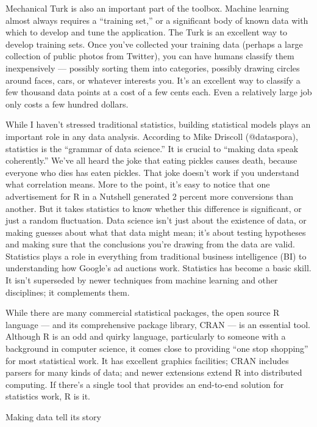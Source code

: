 Mechanical Turk is also an important part of the toolbox. Machine learning almost always requires a “training set,” or a significant body of known data with which to develop and tune the application. The Turk is an excellent way to develop training sets. Once you’ve collected your training data (perhaps a large collection of public photos from Twitter), you can have humans classify them inexpensively — possibly sorting them into categories, possibly drawing circles around faces, cars, or whatever interests you. It’s an excellent way to classify a few thousand data points at a cost of a few cents each. Even a relatively large job only costs a few hundred dollars.

While I haven’t stressed traditional statistics, building statistical models plays an important role in any data analysis. According to Mike Driscoll (@dataspora), statistics is the “grammar of data science.” It is crucial to “making data speak coherently.” We’ve all heard the joke that eating pickles causes death, because everyone who dies has eaten pickles. That joke doesn’t work if you understand what correlation means. More to the point, it’s easy to notice that one advertisement for R in a Nutshell generated 2 percent more conversions than another. But it takes statistics to know whether this difference is significant, or just a random fluctuation. Data science isn’t just about the existence of data, or making guesses about what that data might mean; it’s about testing hypotheses and making sure that the conclusions you’re drawing from the data are valid. Statistics plays a role in everything from traditional business intelligence (BI) to understanding how Google’s ad auctions work. Statistics has become a basic skill. It isn’t superseded by newer techniques from machine learning and other disciplines; it complements them.

While there are many commercial statistical packages, the open source R language — and its comprehensive package library, CRAN — is an essential tool. Although R is an odd and quirky language, particularly to someone with a background in computer science, it comes close to providing “one stop shopping” for most statistical work. It has excellent graphics facilities; CRAN includes parsers for many kinds of data; and newer extensions extend R into distributed computing. If there’s a single tool that provides an end-to-end solution for statistics work, R is it.

Making data tell its story

